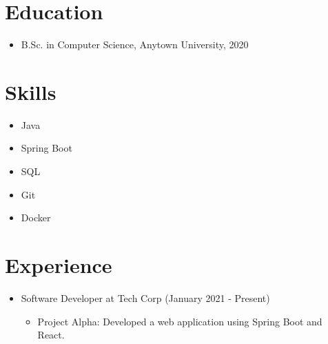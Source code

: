 \documentclass[11pt, a4paper]{awesome-cv} %
\begin{document}
\address{123 Main St, Anytown, USA}



	
	\makecvheader %
	
	
	\section{Education}
	\begin{itemize}
		\item B.Sc. in Computer Science, Anytown University, 2020
	\end{itemize}
	
	\section{Skills}
	\begin{itemize}
		\item Java
		\item Spring Boot
		\item SQL
		\item Git
		\item Docker
	\end{itemize}
	
	\section{Experience}
	\begin{itemize}
		\item Software Developer at Tech Corp (January 2021 - Present)
		\begin{itemize}
			\item Project Alpha: Developed a web application using Spring Boot and React.
		\end{itemize}
		
	\end{itemize}
	
\end{document}
